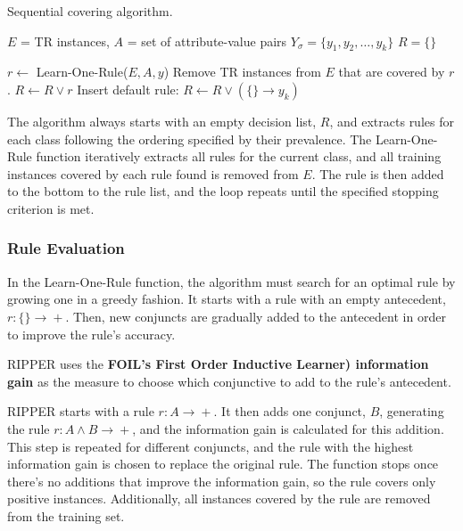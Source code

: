 \begin{algorithm}
\caption{Sequential covering algorithm.}
\begin{algorithmic}[1]
    \State $E$ = TR instances, $A$ = set of attribute-value pairs
    \State $Y_{\sigma} = \{y_1, y_2, \dots , y_k\}$
    \State $R = \{ \}$

            \State $r \leftarrow{}$ Learn-One-Rule($E,A,y$)
            \State Remove TR instances from $E$ that are covered by $r$.
            \State $R \leftarrow{} R \lor r$
        \EndWhile
    \EndFor
    \State Insert default rule: $R \leftarrow{} R \lor (\{\} \rightarrow{} y_k)$
\end{algorithmic}
\end{algorithm}

The algorithm always starts with an empty decision list, $R$, and extracts rules for each class following the ordering specified by their prevalence. The Learn-One-Rule function iteratively extracts all rules for the current class, and all training instances covered by each rule found is removed from $E$. The rule is then added to the bottom to the rule list, and the loop repeats until the specified stopping criterion is met.

\subsubsection{Rule Evaluation}

In the Learn-One-Rule function, the algorithm must search for an optimal rule by growing one in a greedy fashion. It starts with a rule with an empty antecedent, $r : \{ \} \rightarrow{} +$. Then, new conjuncts are gradually added to the antecedent in order to improve the rule's accuracy.

RIPPER uses the \textbf{FOIL's First Order Inductive Learner) information gain} as the measure to choose which conjunctive to add to the rule's antecedent.

RIPPER starts with a rule $r : A \rightarrow{} +$. It then adds one conjunct, $B$, generating the rule $r : A \land B \rightarrow{} +$, and the information gain is calculated for this addition. This step is repeated for different conjuncts, and the rule with the highest information gain is chosen to replace the original rule. The function stops once there's no additions that improve the information gain, so the rule covers only positive instances. Additionally, all instances covered by the rule are removed from the training set.

